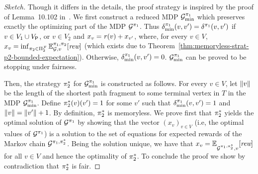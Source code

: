 \begin{proof}[Sketch]
  Though it differs in the details, the proof strategy is inspired by
  the proof of Lemma~10.102 in~\cite{BaierK08}.
  We first construct a reduced MDP $\mathcal{G}^{\pi_{1}}_{\min}$ which
  preserves exactly the optimizing part of the MDP
  $\mathcal{G}^{\pi_{1}}$.
  Thus $\delta^{\pi_{1}}_{\min}(v,v')=\delta^{\pi_{1}}(v,v')$ if
  $v\in V_1\cup V_{\mathsf{P}}$, or $v\in V_2$ and
  $x_v=\mathit{r}(v)+x_{v'}$, where, for every $v\in V$,
  $x_v = \inf_{\pi_{2} \in \Pi^{\mathcal{F}}_{2}} \mathbb{E}^{\pi_{1}, \pi_{2}}_{\mathcal{G},v}[\textit{rew}]$
  (which exists due to Theorem~\ref{thm:memoryless-strat-p2-bounded-expectation}).
  Otherwise, $\delta^{\pi_{1}}_{\min}(v,v')=0$.
  $\mathcal{G}^{\pi_{1}}_{\min}$ can be proved to be stopping under fairness.

  Then, the strategy $\pi^*_{2}$ for
  $\mathcal{G}^{\pi_{1}}_{\min}$ is constructed as follows.  For every
  $v\in V$, let ${\lVert{v}\rVert}$ be the length of the shortest path
  fragment to some terminal vertex in $T$ in the MDP
  $\mathcal{G}^{\pi_{1}}_{\min}$.  Define $\pi^*_{2}(v)(v')=1$
  for some $v'$ such that $\delta^{\pi_{1}}_{\min}(v,v')=1$ and
  ${\lVert{v}\rVert}={\lVert{v'}\rVert}+1$.
  By definition, $\pi^*_{2}$ is  memoryless.  We prove first that
  $\pi^*_{2}$ yields the optimal solution of
  $\mathcal{G}^{\pi_{1}}$ by showing that the vector $(x_v)_{v\in V}$
  (i.e, the optimal values of $\mathcal{G}^{\pi_{1}}$) is a solution to
  the set of equations for expected rewards of the Markov chain
  $\mathcal{G}^{\pi_{1},\pi^*_{2}}$.  Being the solution unique,
  we have that
  $x_v=\mathbb{E}^{}_{\mathcal{G}^{\pi_{1},\pi^*_{2}},v}[\textit{rew}]$
  for all $v\in V$ and hence the optimality of $\pi^*_{2}$.
  To conclude the proof we show by contradiction that
  $\pi^*_{2}$ is fair.
\qedhere
\end{proof}
\fi
